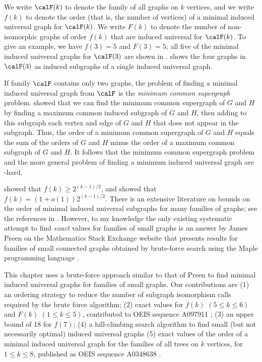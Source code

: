 We write $\calF(k)$ to denote the family of all graphs on $k$ vertices,
and we write $f(k)$ to denote the order (that is, the
number of vertices) of a minimal induced universal graph for $\calF(k)$.
We write $F(k)$ to denote the number of non-isomorphic graphs of order $f(k)$
that are induced universal for $\calF(k)$.
To give an example, we have $f(3)=5$ and $F(3)=5$; all five of the minimal
induced universal graphs
for $\calF(3)$ are shown in .  shows the four
graphs in $\calF(3)$ as induced subgraphs of a single induced universal graph.

If family $\calF$ contains only two graphs, the problem of finding a minimal
induced universal graph from $\calF$ is the \emph{minimum common supergraph}
problem.  \citet{DBLP:journals/computing/BunkeJK00}
showed that we can find the minimum common supergraph of $G$ and $H$ by
finding a maximum common induced subgraph of $G$ and $H$, then adding to this
subgraph each vertex and edge of $G$ and $H$ that does not appear in the subgraph.
Thus, the order of a minimum common supergraph of $G$ and $H$ equals the sum
of the orders of $G$ and $H$ minus the order of a maximum common subgraph
of $G$ and $H$.  It follows that the minimum common supergraph problem
and the more general problem of finding a minimum induced universal graph
are \NP-hard.

\citet{moon_1965} showed that $f(k) \geq 2^{(k-1)/2}$,
and \citet{alon2017asymptotically} showed that $f(k) = (1 + o(1))2^{(k-1)/2}$.
There is an extensive literature on bounds on
the order of minimal induced universal subgraphs for many families of graphs;
see the references in \cite{alon2017asymptotically}.
However, to my knowledge the only
existing systematic attempt to find \emph{exact} values for families of small
graphs is an answer by James Preen on the Mathematics Stack Exchange website that
presents results for families of small connected graphs obtained by brute-force
search using the Maple programming language \citep{preen_math_se}.

This chapter uses a brute-force approach similar to that of Preen to find minimal
induced universal graphs for families of small graphs.  Our contributions
are (1) an ordering strategy to reduce the number of subgraph isomorphism
calls required by the brute force algorithm; (2) exact values for $f(k)$ $(5 \leq k \leq 6)$
and $F(k)$ $(1 \leq k \leq 5)$,
contributed to OEIS sequence A097911 \citep{oeisA097911};
(3) an upper bound of 18 for $f(7)$; (4) a hill-climbing
search algorithm to find small (but not necessarily optimal) induced universal graphs
(5) exact values of the order of a minimal induced universal graph
for the families of all trees on $k$ vertices, for $1 \leq k \leq 8$,
published as OEIS sequence A0348638 \citep{oeisA348638}.

